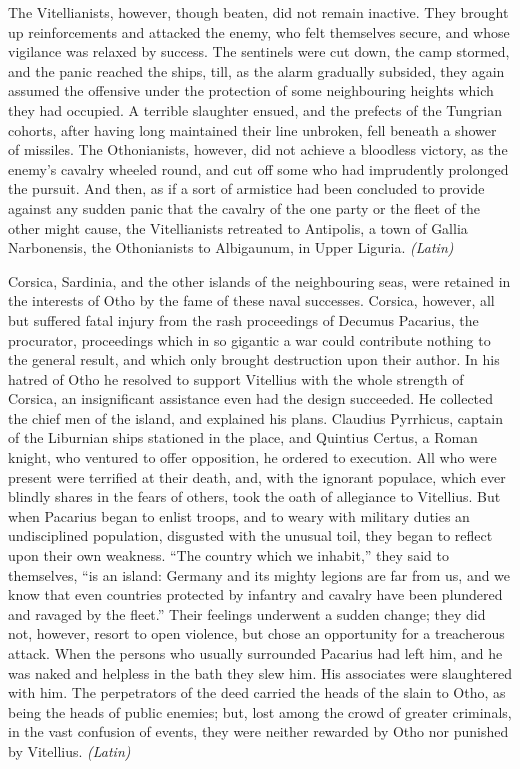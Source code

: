 The Vitellianists, however, though beaten, did not remain inactive. They brought up reinforcements and attacked the enemy, who felt themselves secure, and whose vigilance was relaxed by success. The sentinels were cut down, the camp stormed, and the panic reached the ships, till, as the alarm gradually subsided, they again assumed the offensive under the protection of some neighbouring heights which they had occupied. A terrible slaughter ensued, and the prefects of the Tungrian cohorts, after having long maintained their line unbroken, fell beneath a shower of missiles. The Othonianists, however, did not achieve a bloodless victory, as the enemy's cavalry wheeled round, and cut off some who had imprudently prolonged the pursuit. And then, as if a sort of armistice had been concluded to provide against any sudden panic that the cavalry of the one party or the fleet of the other might cause, the Vitellianists retreated to Antipolis, a town of Gallia Narbonensis, the Othonianists to Albigaunum, in Upper Liguria. \emph{(Latin)}


Corsica, Sardinia, and the other islands of the neighbouring seas, were retained in the interests of Otho by the fame of these naval successes. Corsica, however, all but suffered fatal injury from the rash proceedings of Decumus Pacarius, the procurator, proceedings which in so gigantic a war could contribute nothing to the general result, and which only brought destruction upon their author. In his hatred of Otho he resolved to support Vitellius with the whole strength of Corsica, an insignificant assistance even had the design succeeded. He collected the chief men of the island, and explained his plans. Claudius Pyrrhicus, captain of the Liburnian ships stationed in the place, and Quintius Certus, a Roman knight, who ventured to offer opposition, he ordered to execution. All who were present were terrified at their death, and, with the ignorant populace, which ever blindly shares in the fears of others, took the oath of allegiance to Vitellius. But when Pacarius began to enlist troops, and to weary with military duties an undisciplined population, disgusted with the unusual toil, they began to reflect upon their own weakness. ``The country which we inhabit,'' they said to themselves, ``is an island: Germany and its mighty legions are far from us, and we know that even countries protected by infantry and cavalry have been plundered and ravaged by the fleet.'' Their feelings underwent a sudden change; they did not, however, resort to open violence, but chose an opportunity for a treacherous attack. When the persons who usually surrounded Pacarius had left him, and he was naked and helpless in the bath they slew him. His associates were slaughtered with him. The perpetrators of the deed carried the heads of the slain to Otho, as being the heads of public enemies; but, lost among the crowd of greater criminals, in the vast confusion of events, they were neither rewarded by Otho nor punished by Vitellius. \emph{(Latin)}

